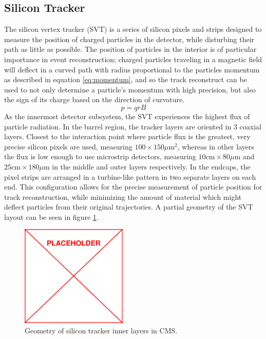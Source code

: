 \subsection{Silicon Tracker} 
\label{subsec:tracker}
The silicon vertex tracker (SVT) is a series of silicon pixels and strips designed to measure the position of charged particles in the detector, while disturbing their path as little as possible. The position of particles in the interior is of particular importance in event reconstruction; charged particles traveling in a magnetic field will deflect in a curved path with radius proportional to the particles momentum as described in equation \ref{eq:momentum}, and so the track reconstruct can be used to not only determine a particle's momentum with high precision, but also the sign of its charge based on the direction of curvature.
\begin{equation}
	\label{eq:momentum}
	p = qrB
\end{equation}
As the innermost detector subsystem, the SVT experiences the highest flux of particle radiation. In the barrel region, the tracker layers are oriented in 3 coaxial layers. Closest to the interaction point where particle flux is the greatest, very precise silicon pixels are used, measuring $100\times150 \mu \text{m}^2$, whereas in other layers the flux is low enough to use microstrip detectors, measuring $10 \text{cm}\times80\mu \text{m}$ and  $25 \text{cm}\times180\mu \text{m}$ in the middle and outer layers respectively. In the endcaps, the pixel strips are arranged in a turbine-like pattern in two separate layers on each end. This configuration allows for the precise measurement of particle position for track reconstruction, while minimizing the amount of material which might deflect particles from their original trajectories. A partial geometry of the SVT layout can be seen in figure \ref{fig:pixelLayout}.
\begin{figure}
	\centering
	\includegraphics[width=0.45\textwidth]{figs/placeholder}
	\caption{Geometry of silicon tracker inner layers in CMS.}
	\label{fig:pixelLayout}
\end{figure}

